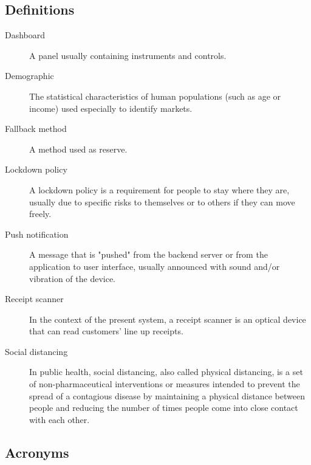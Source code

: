 \documentclass[../../main.tex]{subfiles}
\begin{document}
\subsection{Definitions}

\begin{description}
    
    \item[Dashboard] A panel usually containing instruments and controls.
    
    \item[Demographic] The statistical characteristics of human populations (such as age or income) used especially to identify markets.
    
    \item[Fallback method] A method used as reserve.

    \item[Lockdown policy] A lockdown policy is a requirement for people to stay where they are, usually due to specific risks to themselves or to others if they can move freely. 

    \item[Push notification] A message that is "pushed" from the backend server or from the application to user interface, usually announced with sound and/or vibration of the device.

    \item[Receipt scanner] In the context of the present system, a receipt scanner is an optical device that can read customers' line up receipts.

    \item[Social distancing] In public health, social distancing, also called physical distancing,
                             is a set of non-pharmaceutical interventions or measures intended to prevent the spread of a contagious disease by maintaining 
                             a physical distance between people and reducing the number of times people come into close contact with each other.
\end{description}

\subsection{Acronyms}
\end{document}
